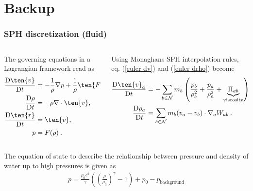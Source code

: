 \section{Backup}
\begin{frame}
    \frametitle{SPH discretization (fluid)}
    \begin{columns}[T] %
        \begin{column}{.4\textwidth}
            The governing equations in a Lagrangian framework read as
            \begin{align}
                \label{euler dv}
                \td{\ten{v}}{t} & = - \frac{1}{\rho} \nabla p + \frac{1}{\rho} \ten{F}^{(\nu)}
                +
                \ten{g},
                \\
                \label{euler drho}
                \td{\rho}{t}    & = -\rho \nabla \cdot \ten{v},
                \\
                \td{\ten{r}}{t} & = \ten{v},
                \\
                p               & = F(\rho) \: .
            \end{align}
        \end{column}
        \hfill
        \begin{column}{.5\textwidth}
            Using Monaghans \cite{Monaghan2005} SPH interpolation rules, eq. (\ref{euler dv})
            and (\ref{euler drho}) become
            \begin{align}
                \td{\ten{v}_a}{t} & = - \sum_{b \in \mathcal{N}}m_b
                \left(\frac{p_b}{\rho_b^2}+\frac{p_a}{\rho_a^2} +
                \underbrace{\Pi_{ab}}_{\text{viscosity}}
                \right) \nabla_a W_{ab} + \ten{g},
                \\
                \label{sph dv}
                \td{\rho_a}{t}    & = \sum_{b \in \mathcal{N}} m_b (v_a - v_b) \cdot \nabla_a
                W_{ab}	\: .
            \end{align}
        \end{column}
    \end{columns}
    \vspace{1cm}
    The equation of state to describe the relationship between pressure and density of water up
    to high pressures is given as
    \begin{align}
        p =\frac{\rho_0 c^2}{\gamma} \left(\left(\frac{\rho}{\rho_0}\right)^\gamma - 1\right) +
        p_0 - p_{\text{background}}
    \end{align}
\end{frame}

